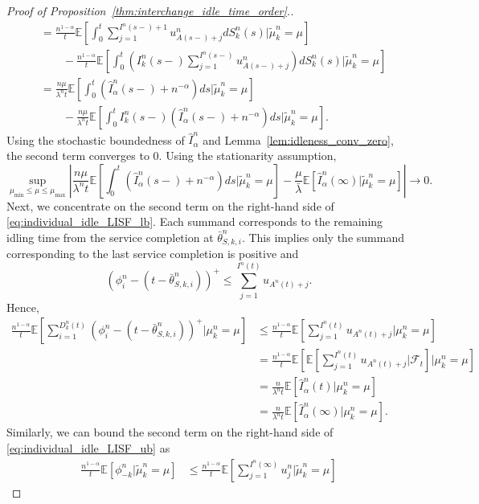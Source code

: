 \documentclass[a4paper,11pt,twoside]{article}
\numberwithin{equation}{section}
\numberwithin{figure}{section}
\theoremstyle{plain}
\newcommand{\cF}{\mathcal{F}}
\newcommand{\EE}{\mathbb{E}}
\newcommand{\1}{\mathbbm{1}}
\begin{document}
\begin{proof}[Proof of Proposition~\ref{thm:interchange_idle_time_order}.]
\begin{align*}
 &=\frac{n^{1-\alpha}}{t}\EE\left[\int_0^t\sum_{j=1}^{I^n(s-)+1}u_{A(s-)+j}^ndS_k^n(s)|\tilde{\mu}_k^n=\mu\right]\\
 &\qquad- \frac{n^{1-\alpha}}{t}\EE\left[\int_0^t\left(I_k^n(s-)\sum_{j=1}^{I^n(s-)}u_{A(s-)+j}^n\right)dS_k^n(s)|\tilde{\mu}_k^n=\mu\right]\\
 &=\frac{n\mu}{\lambda^n t}\EE\left[\int_0^t(\hat{I}_\alpha^n(s-)+n^{-\alpha})ds|\tilde{\mu}_k^n=\mu\right]\\
 &\qquad -\frac{n\mu}{\lambda^n t}\EE\left[\int_0^tI_k^n(s-)(\hat{I}_\alpha^n(s-)+n^{-\alpha})ds|\tilde{\mu}_k^n=\mu\right].
 \end{align*}
Using the stochastic boundedness of $\hat{I}_\alpha^n$ and Lemma~\ref{lem:idleness_conv_zero}, the second term converges to 0. Using the stationarity assumption, 
\begin{equation*}
    \sup_{\mu_{\min}\leq \mu\leq \mu_{\max}}\left|\frac{n\mu}{\lambda^n t}\EE\left[\int_0^t(\hat{I}_\alpha^n(s-)+n^{-\alpha})ds|\tilde{\mu}_k^n=\mu\right]- \frac{\mu}{\bar{\lambda}}\EE[\hat{I}_\alpha^n(\infty)|\tilde{\mu}_k^n=\mu]\right|\to 0.
\end{equation*}
 Next, we concentrate on the second term on the right-hand side of \eqref{eq:individual_idle_LISF_lb}. Each summand corresponds to the remaining idling time from the service completion at $\bar{\theta}_{S,k,i}^n$. This implies only the summand corresponding to the last service completion is positive and 
 \[
 (\phi_i^n-(t-\bar{\theta}_{S,k,i}^n))^+\leq \sum_{j=1}^{I^n(t)}u_{A^n(t)+j}.
 \]
 Hence,
 \begin{align*}
     \frac{n^{1-\alpha}}{t}\EE\left[\sum_{i=1}^{D_k^n(t)}(\phi_i^n-(t-\bar{\theta}_{S,k,i}^n))^+|\mu_k^n=\mu\right]&\leq \frac{n^{1-\alpha}}{t}\EE\left[\sum_{j=1}^{I^n(t)}u_{A^n(t)+j}|\mu_k^n=\mu\right]\\
     &=\frac{n^{1-\alpha}}{t}\EE\left[\EE\left[\sum_{j=1}^{I^n(t)}u_{A^n(t)+j}|\cF_t\right]|\mu_k^n=\mu\right]\\
     &=\frac{n}{\lambda^nt}\EE\left[\hat{I}_\alpha^n(t)|\mu_k^n=\mu\right]\\
     &=\frac{n}{\lambda^nt}\EE\left[\hat{I}_\alpha^n(\infty)|\mu_k^n=\mu\right].
 \end{align*}
 Similarly, we can bound the second term on the right-hand side of \eqref{eq:individual_idle_LISF_ub} as 
 \begin{align*}
     \frac{n^{1-\alpha}}{t}\EE[\phi_{-k}^n|\tilde{\mu}_k^n=\mu]&\leq \frac{n^{1-\alpha}}{t}\EE\left[\sum_{j=1}^{I^n(\infty)}u_{j}^n|\tilde{\mu}_k^n=\mu\right]

\end{align*}
\end{proof}
\end{document}

